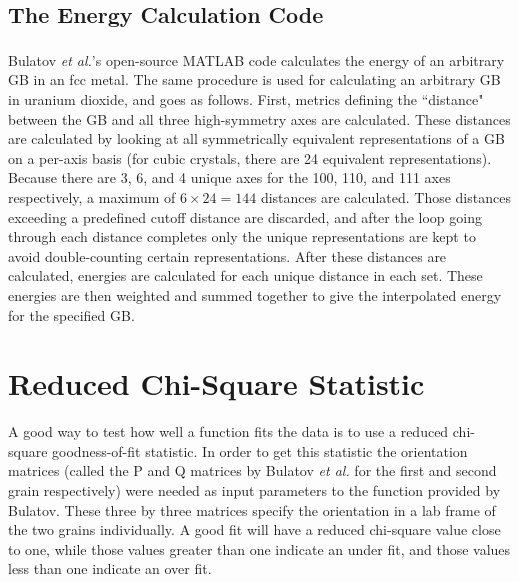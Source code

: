\documentclass[12pt]{report}
\begin{document}

\subsection{The Energy Calculation Code}
Bulatov \emph{et al.}'s open-source MATLAB\textsuperscript{\textregistered} code\cite{bulatov2014} calculates the energy of an arbitrary GB in an fcc metal. The same procedure is used for calculating an arbitrary GB in uranium dioxide, and goes as follows.  First, metrics defining the ``distance" between the GB and all three high-symmetry axes are calculated.  These distances are calculated by looking at all symmetrically equivalent representations of a GB on a per-axis basis (for cubic crystals, there are 24 equivalent representations\cite{stokes2007}).  Because there are 3, 6, and 4 unique axes for the \textlangle{}100\textrangle{}, \textlangle{}110\textrangle{}, and \textlangle{}111\textrangle{} axes respectively, a maximum of $6\times24=144$ distances are calculated.  Those distances exceeding a predefined cutoff distance are discarded, and after the loop going through each distance completes only the unique representations are kept to avoid double-counting certain representations.\cite{bulatov2014}  After these distances are calculated, energies are calculated for each unique distance in each set.  These energies are then weighted and summed together to give the interpolated energy for the specified GB. %

\section{Reduced Chi-Square Statistic}
A good way to test how well a function fits the data is to use a reduced chi-square goodness-of-fit statistic.\cite{bevington2003}  In order to get this statistic the orientation matrices (called the P and Q matrices by Bulatov \emph{et al.} for the first and second grain respectively) were needed as input parameters to the function provided by Bulatov.  These three by three matrices specify the orientation in a lab frame of the two grains individually. A good fit will have a reduced chi-square value close to one, while those values greater than one indicate an under fit, and those values less than one indicate an over fit.\cite{bevington2003}
\end{document}
